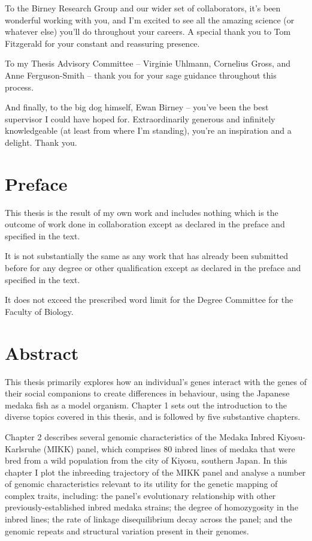 \documentclass[
]{book}
\begin{document}
To the Birney Research Group and our wider set of collaborators, it's been wonderful working with you, and I'm excited to see all the amazing science (or whatever else) you'll do throughout your careers. A special thank you to Tom Fitzgerald for your constant and reassuring presence.

To my Thesis Advisory Committee -- Virginie Uhlmann, Cornelius Gross, and Anne Ferguson-Smith -- thank you for your sage guidance throughout this process.

And finally, to the big dog himself, Ewan Birney -- you've been the best supervisor I could have hoped for. Extraordinarily generous and infinitely knowledgeable (at least from where I'm standing), you're an inspiration and a delight. Thank you.

\hypertarget{preface}{%
\chapter*{Preface}\label{preface}}

This thesis is the result of my own work and includes nothing which is the outcome of work done in collaboration except as declared in the preface and specified in the text.

It is not substantially the same as any work that has already been submitted before for any degree or other qualification except as declared in the preface and specified in the text.

It does not exceed the prescribed word limit for the Degree Committee for the Faculty of Biology.

\hypertarget{abstract}{%
\chapter*{Abstract}\label{abstract}}

This thesis primarily explores how an individual's genes interact with the genes of their social companions to create differences in behaviour, using the Japanese medaka fish as a model organism. Chapter 1 sets out the introduction to the diverse topics covered in this thesis, and is followed by five substantive chapters.

Chapter 2 describes several genomic characteristics of the Medaka Inbred Kiyosu-Karlsruhe (MIKK) panel, which comprises 80 inbred lines of medaka that were bred from a wild population from the city of Kiyosu, southern Japan. In this chapter I plot the inbreeding trajectory of the MIKK panel and analyse a number of genomic characteristics relevant to its utility for the genetic mapping of complex traits, including: the panel's evolutionary relationship with other previously-established inbred medaka strains; the degree of homozygosity in the inbred lines; the rate of linkage disequilibrium decay across the panel; and the genomic repeats and structural variation present in their genomes.
\end{document}
